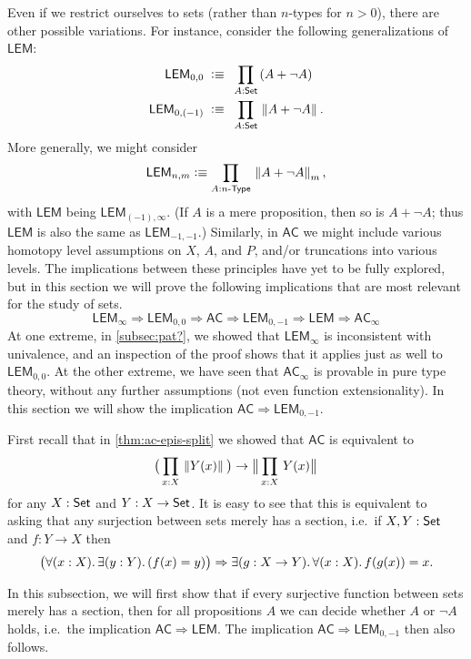 Even if we restrict ourselves to sets (rather than $n$-types for $n>0$), there are other possible variations.
For instance, consider the following generalizations of $\mathsf{LEM}$:
%
\begin{align*}
  \mathsf{LEM}_{0,0}\;\defeq\;&\ \prd{A:\set} (A + \neg A) \\
  \mathsf{LEM}_{0,(-1)}\;\defeq\;&\ \prd{A:\set} \brck{A + \neg A}.
\end{align*}
%
More generally, we might consider
%
\begin{equation*}
  \mathsf{LEM}_{n,m}\defeq \prd{A:\ntype{n}} \trunc m{A+\neg A},
\end{equation*}
%
with $\mathsf{LEM}$ being $\mathsf{LEM}_{(-1),\infty}$.
(If $A$ is a mere proposition, then so is $A+\neg A$; thus $\mathsf{LEM}$ is also the same as $\mathsf{LEM}_{-1,-1}$.)
Similarly, in $\mathsf{AC}$ we might include various homotopy level assumptions on $X$, $A$, and $P$, and/or truncations into various levels.
The implications between these principles have yet to be fully explored, but in this section we will prove the following implications that are most relevant for the study of sets.
\[
\mathsf{LEM}_\infty \Rightarrow \mathsf{LEM}_{0,0} \Rightarrow  \mathsf{AC} \Rightarrow \mathsf{LEM}_{0,-1} \Rightarrow \mathsf{LEM}\Rightarrow \mathsf{AC}_\infty
\]
At one extreme, in \autoref{subsec:pat?}, we showed that $\mathsf{LEM}_\infty$ is inconsistent with univalence, and an inspection of the proof shows that it applies just as well to $\mathsf{LEM}_{0,0}$.
At the other extreme, we have seen that $\mathsf{AC}_\infty$ is provable in pure type theory, without any further assumptions (not even function extensionality).
In this section we will show the implication $\mathsf{AC} \Rightarrow \mathsf{LEM}_{0,-1}$.

First recall that in \autoref{thm:ac-epis-split} we showed that $\mathsf{AC}$ is equivalent to
\[ \big(\prd{x:X} \brck{Y(x)}\big) \to \bbrck{\prd{x:X} Y(x)} \]
for any $X:\mathsf{Set}$ and $Y:X\to\mathsf{Set}$.
It is easy to see that this is equivalent to asking that any surjection between sets merely has a section, i.e.\ if $X,Y:\mathsf{Set}$ and $f:Y\to X$ then
\[ \big(\fall{x:X}\exis{y:Y} (f(x)=y)\big) \Rightarrow \exis{g:X\to Y}\fall{x:X} f(g(x))=x. \]

In this subsection, we will first show that if every surjective function between sets merely has
a section, then for all propositions $A$ we can decide whether $A$ or $\neg A$
holds, i.e.\ the implication $\mathsf{AC} \Rightarrow \mathsf{LEM}$.  The implication $\mathsf{AC} \Rightarrow \mathsf{LEM}_{0,-1}$ then also follows.

